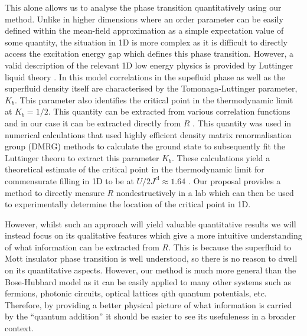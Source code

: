 This alone allows us to analyse the phase transition quantitatively
using our method. Unlike in higher dimensions where an order parameter
can be easily defined within the mean-field approximation as a simple
expectation value of some quantity, the situation in 1D is more
complex as it is difficult to directly access the excitation energy
gap which defines this phase transition. However, a valid description
of the relevant 1D low energy physics is provided by Luttinger liquid
theory \cite{giamarchi}. In this model correlations in the supefluid
phase as well as the superfluid density itself are characterised by
the Tomonaga-Luttinger parameter, $K_b$. This parameter also
identifies the critical point in the thermodynamic limit at $K_b =
1/2$. This quantity can be extracted from various correlation
functions and in our case it can be extracted directly from $R$
\cite{ejima2011}. This quantity was used in numerical calculations
that used highly efficient density matrix renormalisation group (DMRG)
methods to calculate the ground state to subsequently fit the
Luttinger theoru to extract this parameter $K_b$. These calculations
yield a theoretical estimate of the critical point in the
thermodynamic limit for commensurate filling in 1D to be at
$U/2J^\text{cl} \approx 1.64$ \cite{ejima2011}. Our proposal provides
a method to directly measure $R$ nondestructively in a lab which can
then be used to experimentally determine the location of the critical
point in 1D.

However, whilst such an approach will yield valuable quantitative
results we will instead focus on its qualitative features which give a
more intuitive understanding of what information can be extracted from
$R$. This is because the superfluid to Mott insulator phase transition
is well understood, so there is no reason to dwell on its quantitative
aspects. However, our method is much more general than the
Bose-Hubbard model as it can be easily applied to many other systems
such as fermions, photonic circuits, optical lattices qith quantum
potentials, etc. Therefore, by providing a better physical picture of
what information is carried by the ``quantum addition'' it should be
easier to see its usefuleness in a broader context.

